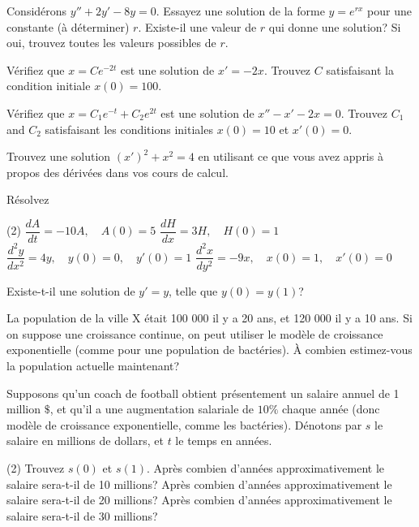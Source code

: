 \begin{exercise}
Consid\'erons $y'' + 2y' - 8y = 0$.  Essayez une solution de la forme $y = e^{rx}$ pour une constante (\`a d\'eterminer) $r$.  Existe-il une valeur de $r$ qui donne une solution? Si oui, trouvez toutes les valeurs possibles de $r$.
\end{exercise}

\begin{exercise}
V\'erifiez que $x = C e^{-2t}$ est une solution de $x' = -2x$.
Trouvez $C$ satisfaisant la condition initiale $x(0) = 100$.
\end{exercise}

\begin{exercise}
V\'erifiez que $x = C_1 e^{-t} + C_2 e^{2t}$ est une solution de $x'' - x' -2 x =
0$.  Trouvez $C_1$ and $C_2$ satisfaisant les conditions initiales $x(0) = 10$
et $x'(0) = 0$.
\end{exercise}

\begin{exercise}
Trouvez une solution
${(x')}^2 + x^2 = 4$
en utilisant ce que vous avez appris \`a propos des d\'eriv\'ees dans vos cours de calcul.
\end{exercise}

\begin{exercise}
R\'esolvez 
\begin{tasks}(2)
\task $\dfrac{dA}{dt} = -10 A, \quad A(0)=5$
\task $\dfrac{dH}{dx} = 3 H, \quad H(0)=1$
\task $\dfrac{d^2y}{dx^2} = 4 y, \quad y(0)=0, \quad y'(0)=1$
\task $\dfrac{d^2x}{dy^2} = -9 x, \quad x(0)=1, \quad x'(0)=0$
\end{tasks}
\end{exercise}

\begin{exercise}
Existe-t-il une solution de $y' = y$, telle que $y(0) = y(1)$?
\end{exercise}

\begin{exercise}
La population de la ville X \'etait 100 000 il y a 20 ans, et 120 000 il y a 10 ans.  Si on suppose une croissance continue, on peut utiliser le mod\`ele de croissance exponentielle (comme pour une population de bact\'eries).  \`A combien estimez-vous la population actuelle maintenant?
\end{exercise}

\begin{exercise}
Supposons qu'un coach de football obtient pr\'esentement un salaire annuel de 1 million $\$$, et qu'il a une augmentation salariale de $10\%$ chaque ann\'ee (donc mod\`ele de croissance exponentielle, comme les bact\'eries).  D\'enotons par $s$ le salaire en millions de dollars, et $t$ le temps en ann\'ees.
\begin{tasks}(2)
\task
Trouvez $s(0)$ et $s(1)$.
\task
Apr\`es combien d'ann\'ees approximativement le salaire sera-t-il de 10 millions?
\task
Apr\`es combien d'ann\'ees approximativement le salaire sera-t-il de 20 millions?
\task
Apr\`es combien d'ann\'ees approximativement le salaire sera-t-il de 30 millions?
\end{tasks}
\end{exercise}


